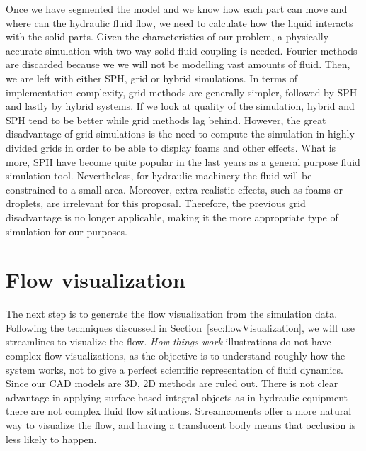 Once we have segmented the model and we know how each part can move and where can the hydraulic fluid flow, we need to calculate how the liquid interacts with the solid parts.
Given the characteristics of our problem, a physically accurate simulation with two way solid-fluid coupling is needed.
Fourier methods are discarded because we we will not be modelling vast amounts of fluid.
Then, we are left with either SPH, grid or hybrid simulations.
In terms of implementation complexity, grid methods are generally simpler, followed by SPH and lastly by hybrid systems.
If we look at quality of the simulation, hybrid and SPH tend to be better while grid methods lag behind.
However, the great disadvantage of grid simulations is the need to compute the simulation in highly divided grids in order to be able to display foams and other effects.
What is more, SPH have become quite popular in the last years as a general purpose fluid simulation tool.
Nevertheless, for hydraulic machinery the fluid will be constrained to a small area.
Moreover, extra realistic effects, such as foams or droplets, are irrelevant for this proposal.
Therefore, the previous grid disadvantage is no longer applicable, making it the more appropriate type of simulation for our purposes.


\section{Flow visualization}

The next step is to generate the flow visualization from the simulation data.
Following the techniques discussed in Section~\ref{sec:flowVisualization}, we will use streamlines to visualize the flow.
\textit{How things work} illustrations do not have complex flow visualizations, as the objective is to understand roughly how the system works, not to give a perfect scientific representation of fluid dynamics.
Since our CAD models are 3D, 2D methods are ruled out.
There is not clear advantage in applying surface based integral objects as in hydraulic equipment there are not complex fluid flow situations.
Streamcoments offer a more natural way to visualize the flow, and having a translucent body means that occlusion is less likely to happen.


